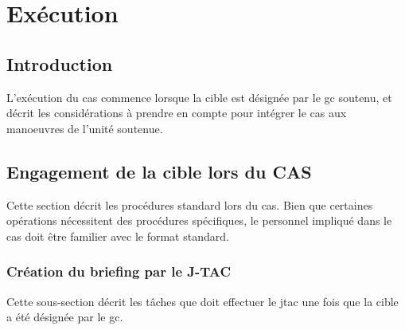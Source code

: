 \chapter{Exécution}

\begin{center}
\end{center}

\section{Introduction}

L'exécution du \gls{cas} commence lorsque la cible est désignée par le \gls{gc} soutenu, et décrit les considérations à prendre en compte pour intégrer le \gls{cas} aux manoeuvres de l'unité soutenue.

\section{Engagement de la cible lors du CAS}

Cette section décrit les procédures standard lors du \gls{cas}. Bien que certaines opérations nécessitent des procédures spécifiques, le personnel impliqué dans le \gls{cas} doit être familier avec le format standard.

\subsection{Création du briefing par le J-TAC}
Cette sous-section décrit les tâches que doit effectuer le \gls{jtac} une fois que la cible a été désignée par le \gls{gc}.

